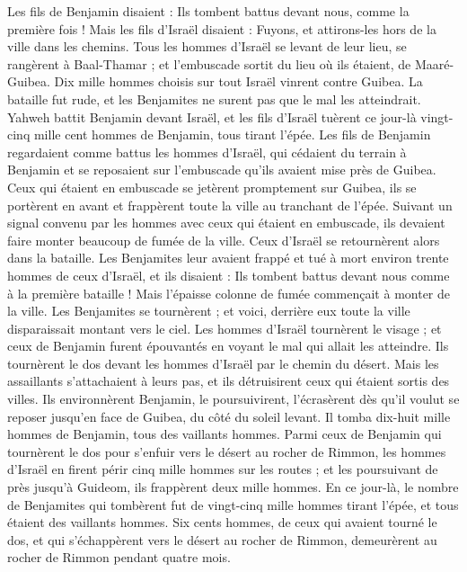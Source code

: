 \begin{multicols}{2}
Les fils de Benjamin disaient : Ils tombent battus devant nous, comme la première fois ! Mais les fils d'Israël disaient : Fuyons, et attirons-les hors de la ville dans les chemins.
Tous les hommes d'Israël se levant de leur lieu, se rangèrent à Baal-Thamar ; et l'embuscade sortit du lieu où ils étaient, de Maaré-Guibea.
Dix mille hommes choisis sur tout Israël vinrent contre Guibea. La bataille fut rude, et les Benjamites ne surent pas que le mal les atteindrait.
Yahweh battit Benjamin devant Israël, et les fils d'Israël tuèrent ce jour-là vingt-cinq mille cent hommes de Benjamin, tous tirant l'épée.
Les fils de Benjamin regardaient comme battus les hommes d'Israël, qui cédaient du terrain à Benjamin et se reposaient sur l'embuscade qu'ils avaient mise près de Guibea.
Ceux qui étaient en embuscade se jetèrent promptement sur Guibea, ils se portèrent en avant et frappèrent toute la ville au tranchant de l'épée.
Suivant un signal convenu par les hommes avec ceux qui étaient en embuscade, ils devaient faire monter beaucoup de fumée de la ville.
Ceux d'Israël se retournèrent alors dans la bataille. Les Benjamites leur avaient frappé et tué à mort environ trente hommes de ceux d'Israël, et ils disaient : Ils tombent battus devant nous comme à la première bataille !
Mais l'épaisse colonne de fumée commençait à monter de la ville. Les Benjamites se tournèrent ; et voici, derrière eux toute la ville disparaissait montant vers le ciel.
Les hommes d'Israël tournèrent le visage ; et ceux de Benjamin furent épouvantés en voyant le mal qui allait les  atteindre.
Ils tournèrent le dos devant les hommes d'Israël par le chemin du désert. Mais les assaillants s'attachaient à leurs pas, et ils détruisirent ceux qui étaient sortis des villes.
Ils environnèrent Benjamin, le poursuivirent, l'écrasèrent dès qu'il voulut se reposer jusqu'en face de Guibea, du côté du soleil levant.
Il tomba dix-huit mille hommes de Benjamin, tous des vaillants hommes.
Parmi ceux de Benjamin qui tournèrent le dos pour s'enfuir vers le désert au rocher de Rimmon, les hommes d'Israël en firent périr cinq mille hommes sur les routes ; et les poursuivant de près jusqu'à Guideom, ils frappèrent deux mille hommes.
En ce jour-là, le nombre de Benjamites qui tombèrent fut de vingt-cinq mille hommes tirant l'épée, et tous étaient des vaillants hommes.
Six cents hommes, de ceux qui avaient tourné le dos, et qui s'échappèrent vers le désert au rocher de Rimmon, demeurèrent au rocher de Rimmon pendant quatre mois.

\end{multicols}
